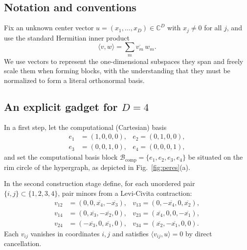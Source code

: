 \documentclass[%
  reprint,
  superscriptaddress,
  showpacs,
  showkeys,
  amsmath,amssymb,
  pra,
  longbibliography,
  floatfix,
  x11names
]{revtex4-2}
\begin{document}
\subsection{Notation and conventions}
Fix an unknown center vector $u = (x_1,\dots,x_D) \in \mathbb{C}^D$ with $x_j \ne 0$ for all $j$, and use the standard Hermitian inner product
\[
\langle v,w\rangle = \sum_m \overline{v_m}\, w_m.
\]
We use vectors to represent the one-dimensional subspaces they span and freely scale them when forming blocks,
with the understanding that they must be normalized to form a literal orthonormal basis.

\subsection{An explicit gadget for $D=4$}

In a first step, let the computational (Cartesian) basis
\begin{align*}
e_1&=(1,0,0,0), &
e_2 =(0,1,0,0),\\
e_3&=(0,0,1,0), &
e_4 =(0,0,0,1),
\end{align*}
and set the computational basis block $\mathcal{B}_{\mathrm{comp}}=\{e_1, e_2, e_3, e_4\}$
be situated on the rim circle of the hypergraph, as depicted in Fig.~\ref{fig:peres}(a).

In the second construction stage define, for each unordered pair $\{i,j\}\subset\{1,2,3,4\}$, pair minors from a Levi-Civita contraction:
\begin{align*}
v_{12} &= (0,0,\overline{x_4},-\overline{x_3}), &
v_{13}  = (0,-\overline{x_4},0,\overline{x_2}), \\
v_{14} &= (0,\overline{x_3},-\overline{x_2},0), &
v_{23}  = (\overline{x_4},0,0,-\overline{x_1}), \\
v_{24} &= (-\overline{x_3},0,\overline{x_1},0), &
v_{34}  = (\overline{x_2},-\overline{x_1},0,0).
\end{align*}
Each $v_{ij}$ vanishes in coordinates $i,j$ and satisfies $\langle v_{ij},u\rangle=0$ by direct cancellation.
\end{document}
